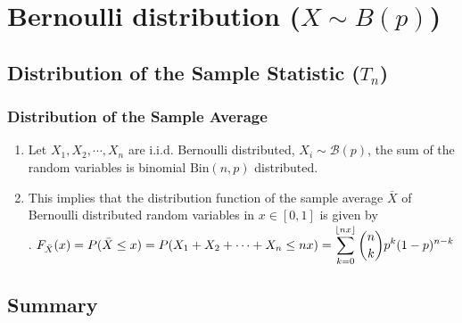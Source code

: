 \section{Bernoulli distribution ($X \sim B(p)$)}



\subsection{Distribution of the Sample Statistic ($T_n$)}

\subsubsection{Distribution of the Sample Average}

\begin{enumerate}
    \item Let $X_1 , X_2, \cdots , X _n$ are i.i.d. Bernoulli distributed, $X _i \sim \mathcal{B} ( p)$, the sum of the random variables is binomial $\text{Bin} (n, p)$ distributed.
    \hfill \cite{statistics/book/Statistics-for-Data-Scientists/Maurits-Kaptein}

    \item This implies that the distribution function of the sample average $\bar{X}$ of Bernoulli distributed random variables in $x \in [0, 1]$ is given by
    \hfill \cite{statistics/book/Statistics-for-Data-Scientists/Maurits-Kaptein}
    \\
    .\hfill
    $
        F _{\bar{X}} (x) 
        = P ( \bar{X} \leq x) 
        = P (X_1 + X_2 + \cdots + X _n \leq nx) 
        = \displaystyle\sum ^{\left \lfloor nx \right \rfloor} _{k=0} \dbinom{n}{k} p ^k (1 - p)^{n-k}
    $
    \hfill \cite{statistics/book/Statistics-for-Data-Scientists/Maurits-Kaptein}

    
\end{enumerate}




\subsection{Summary}


